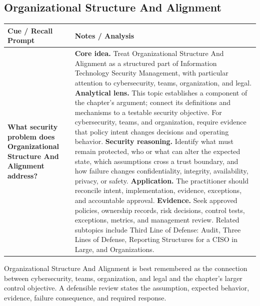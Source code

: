 \documentclass[11pt]{article}
\newcommand{\CornellHeader}{%
\rowcolor{Navy}\color{white}\bfseries Cue / Recall Prompt & \color{white}\bfseries Notes / Analysis\\\hline}
\newcommand{\CornellRow}[2]{%
\cellcolor{CueGray}\RaggedRight\textbf{#1} & \RaggedRight #2\\\hline}
\begin{document}
\subsection*{Organizational Structure And Alignment}
\begin{longtable}{>{\RaggedRight\arraybackslash}p{}|>{\RaggedRight\arraybackslash}p{}}
\CornellHeader
\CornellRow{What security problem does Organizational Structure And Alignment address?}{\textbf{Core idea.} Treat Organizational Structure And Alignment as a structured part of Information Technology Security Management, with particular attention to cybersecurity, teams, organization, and legal. \textbf{Analytical lens.} This topic establishes a component of the chapter's argument; connect its definitions and mechanisms to a testable security objective. For cybersecurity, teams, and organization, require evidence that policy intent changes decisions and operating behavior. \textbf{Security reasoning.} Identify what must remain protected, who or what can alter the expected state, which assumptions cross a trust boundary, and how failure changes confidentiality, integrity, availability, privacy, or safety. \textbf{Application.} The practitioner should reconcile intent, implementation, evidence, exceptions, and accountable approval. \textbf{Evidence.} Seek approved policies, ownership records, risk decisions, control tests, exceptions, metrics, and management review. Related subtopics include Third Line of Defense: Audit, Three Lines of Defense, Reporting Structures for a CISO in Large, and Organizations.}
\end{longtable}
\begin{topicsummary}
Organizational Structure And Alignment is best remembered as the connection between cybersecurity, teams, organization, and legal and the chapter's larger control objective. A defensible review states the assumption, expected behavior, evidence, failure consequence, and required response.
\end{topicsummary}
\end{document}
